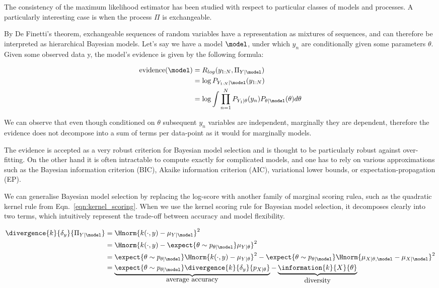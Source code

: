 The consistency of the maximum likelihood estimator has been studied with respect to particular classes of models and processes. A particularly interesting case is when the process $\Pi$ is exchangeable.

By De Finetti's theorem, exchangeable sequences of random variables have a representation as mixtures of \iid sequences, and can therefore be interpreted as hierarchical Bayesian models. Let's say we have a model $\model$, under which $y_n$ are conditionally \iid given some parameters $\theta$. Given some observed data y, the model's evidence is given by the following formula:

\begin{align}
	\mbox{evidence}(\model) &= R_{log}(y_{1:N},\Pi_{Y\vert\model})\\
		&= \log P_{Y_{1:N}\vert\model}(y_{1:N})\\
		&= \log \int \prod_{n=1}^{N} P_{Y_1\vert\theta}(y_n) P_{\theta\vert\model}(\theta) d\theta
\end{align}

We can observe that even though conditioned on $\theta$ subsequent $y_n$ variables are independent, marginally they are dependent, therefore the evidence does not decompose into a sum of terms per data-point as it would for marginally \iid models.

The evidence is accepted as a very robust criterion for Bayesian model selection and is thought to be particularly robust against over-fitting. On the other hand it is often intractable to compute exactly for complicated models, and one has to rely on various approximations such as the Bayesian information criterion (BIC)\cite{}, Akaike information criterion (AIC)\cite{}, variational lower bounds, or expectation-propagation (EP)\cite{}.

We can generalise Bayesian model selection by replacing the log-score with another family of marginal scoring rulea, such as the quadratic kernel rule from Eqn.\ \eqref{eqn:kernel_scoring}. When we use the kernel scoring rule for Bayesian model selection, it decomposes clearly into two terms, which intuitively represent the trade-off between accuracy and model flexibility.

\begin{align}
	\divergence{k}{\delta_{y}}{\Pi_{Y\vert\model}} &= \Hnorm{k(\cdot,y) - \mu_{Y\vert\model}}^2\\
		&= \Hnorm{k(\cdot,y) - \expect{\theta\sim p_{\theta\vert\model}}\mu_{Y\vert\theta}}^2\\
		&= \expect{\theta\sim p_{\theta\vert\model}} \Hnorm{k(\cdot,y) - \mu_{Y\vert\theta}}^2 - \expect{\theta\sim p_{\theta\vert\model}}\Hnorm{\mu_{X\vert \theta,\model} - \mu_{X\vert\model}}^2\\
		&= \underbrace{\expect{\theta\sim p_{\theta\vert\model}} \divergence{k}{\delta_{y}}{p_{X\vert\theta}} }_{\mbox{average accuracy}} -  \underbrace{\information{k}{X}{\theta}}_{\mbox{diversity}}
\end{align}

